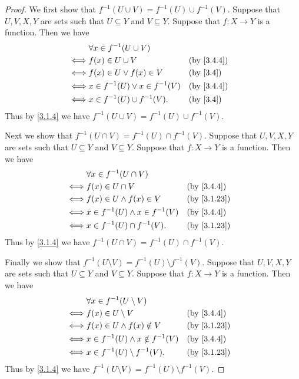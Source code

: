 \begin{proof}
  We first show that \(f^{-1}(U \cup V) = f^{-1}(U) \cup f^{-1}(V)\).
  Suppose that \(U, V, X, Y\) are sets such that \(U \subseteq Y\) and \(V \subseteq Y\).
  Suppose that \(f : X \to Y\) is a function.
  Then we have
  \begin{align*}
         & \forall x \in f^{-1}(U \cup V)                                   \\
    \iff & f(x) \in U \cup V                    &  & \by{3.4.4}             \\
    \iff & f(x) \in U \lor f(x) \in V           &  & \text{(by \cref{3.4})} \\
    \iff & x \in f^{-1}(U) \lor x \in f^{-1}(V) &  & \by{3.4.4}             \\
    \iff & x \in f^{-1}(U) \cup f^{-1}(V).      &  & \text{(by \cref{3.4})}
  \end{align*}
  Thus by \cref{3.1.4} we have \(f^{-1}(U \cup V) = f^{-1}(U) \cup f^{-1}(V)\).

  Next we show that \(f^{-1}(U \cap V) = f^{-1}(U) \cap f^{-1}(V)\).
  Suppose that \(U, V, X, Y\) are sets such that \(U \subseteq Y\) and \(V \subseteq Y\).
  Suppose that \(f : X \to Y\) is a function.
  Then we have
  \begin{align*}
         & \forall x \in f^{-1}(U \cap V)                         \\
    \iff & f(x) \in U \cap V                     &  & \by{3.4.4}  \\
    \iff & f(x) \in U \land f(x) \in V           &  & \by{3.1.23} \\
    \iff & x \in f^{-1}(U) \land x \in f^{-1}(V) &  & \by{3.4.4}  \\
    \iff & x \in f^{-1}(U) \cap f^{-1}(V).       &  & \by{3.1.23}
  \end{align*}
  Thus by \cref{3.1.4} we have \(f^{-1}(U \cap V) = f^{-1}(U) \cap f^{-1}(V)\).

  Finally we show that \(f^{-1}(U \setminus V) = f^{-1}(U) \setminus f^{-1}(V)\).
  Suppose that \(U, V, X, Y\) are sets such that \(U \subseteq Y\) and \(V \subseteq Y\).
  Suppose that \(f : X \to Y\) is a function.
  Then we have
  \begin{align*}
         & \forall x \in f^{-1}(U \setminus V)                       \\
    \iff & f(x) \in U \setminus V                   &  & \by{3.4.4}  \\
    \iff & f(x) \in U \land f(x) \notin V           &  & \by{3.1.23} \\
    \iff & x \in f^{-1}(U) \land x \notin f^{-1}(V) &  & \by{3.4.4}  \\
    \iff & x \in f^{-1}(U) \setminus f^{-1}(V).     &  & \by{3.1.23}
  \end{align*}
  Thus by \cref{3.1.4} we have \(f^{-1}(U \setminus V) = f^{-1}(U) \setminus f^{-1}(V)\).
\end{proof}

